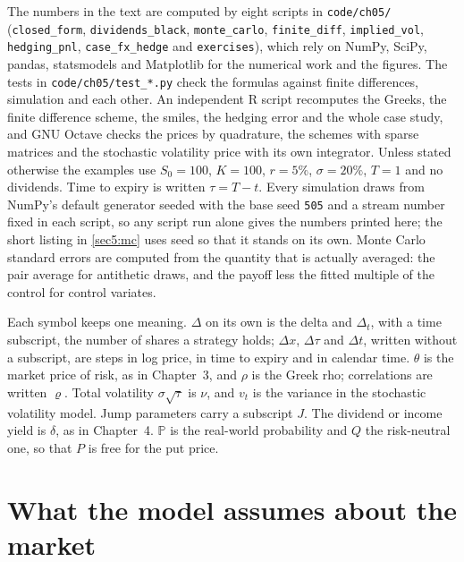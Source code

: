 \begin{chapterrefs}
\begin{keybox}
The numbers in the text are computed by eight scripts in \texttt{code/ch05/}
(\texttt{closed\_form}, \texttt{dividends\_black}, \texttt{monte\_carlo}, \texttt{finite\_diff},
\texttt{implied\_vol}, \texttt{hedging\_pnl}, \texttt{case\_fx\_hedge} and \texttt{exercises}), which
rely on NumPy, SciPy, pandas, statsmodels and Matplotlib for the numerical work and the figures.
The tests in \texttt{code/ch05/test\_*.py} check the formulas against finite differences, simulation
and each other. An independent R script recomputes the Greeks, the finite difference scheme, the
smiles, the hedging error and the whole case study, and GNU Octave checks the prices by quadrature,
the schemes with sparse matrices and the stochastic volatility price with its own integrator. Unless
stated otherwise the examples use $S_0=100$, $K=100$, $r=5\%$, $\sigma=20\%$, $T=1$ and no dividends.
Time to expiry is written $\tau=T-t$.
Every simulation draws from NumPy's default generator seeded with the base seed \texttt{505}
and a stream number fixed in each script, so any script run alone gives the numbers printed here; the short listing in \cref{sec5:mc} uses seed \snipSeed{} so that it stands on its
own. Monte Carlo standard errors are computed from the quantity that is actually averaged: the
pair average for antithetic draws, and the payoff less the fitted multiple of the control for
control variates.

Each symbol keeps one meaning. $\Delta$ on its own is the delta and $\Delta_t$, with a time subscript,
the number of shares a strategy holds; $\Delta x$, $\Delta\tau$ and $\Delta t$, written without a
subscript, are steps in log price, in time to expiry and in calendar time. $\theta$ is the market price of
risk, as in Chapter~3, and $\rho$ is the Greek rho; correlations are written $\varrho$. Total
volatility $\sigma\sqrt\tau$ is $\nu$, and $v_t$ is the variance in the stochastic volatility
model. Jump parameters carry a subscript $J$. The dividend or income yield is $\delta$, as in Chapter~4. $\mathbb P$ is the real-world
probability and $Q$ the risk-neutral one, so that $P$ is free for the put price.
\end{keybox}

\section{What the model assumes about the market}
\label{sec5:model}


\end{chapterrefs}
